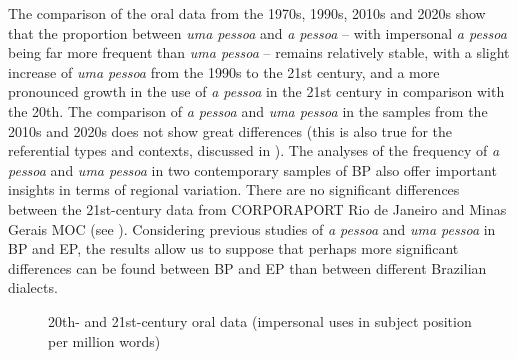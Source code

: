 \documentclass[output=paper]{langscibook}
\begin{document}
The comparison of the oral data from the 1970s, 1990s, 2010s and 2020s show that the proportion between {\textit{uma pessoa}} {and} {\textit{a pessoa}} {– with impersonal} {\textit{a pessoa}} {being far more frequent than} {\textit{uma pessoa}} – remains relatively stable, with a slight increase of {\textit{uma pessoa}} {from the 1990s to the 21st century, and a more pronounced growth in the use of}{ \textit{a pessoa}} {in the 21st}{\textsuperscript{} }{century in comparison with the 20th. The comparison of} {\textit{a pessoa}} {and} {\textit{uma pessoa}} {in the samples from the 2010s and 2020s does not show great differences (this is also true for the referential types and contexts, discussed in ). The analyses of the frequency of} {\textit{a pessoa}} {and} {\textit{uma pessoa}} {in two contemporary samples of BP also offer important insights in terms of regional variation. There are no significant differences between the 21st{}-century data from CORPORAPORT Rio de Janeiro and Minas Gerais MOC (see ). Considering previous studies of} {\textit{a pessoa}} {and} {\textit{uma pessoa}} {in BP and EP, the results allow us to suppose that perhaps more significant differences can be found between BP and EP than between different Brazilian dialects.} 


\begin{figure}
    \caption{\label{fig:amaral:3}20th- and 21st-century oral data (impersonal uses in subject position per million words)}
\end{figure}
\end{document}
